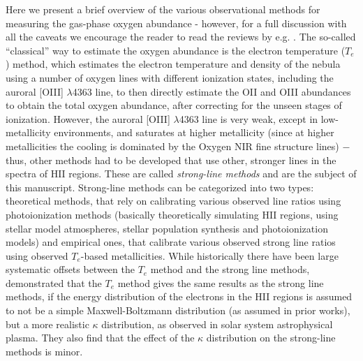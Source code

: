 \documentclass{emulateapj}
\begin{document}
Here we present a brief overview of the various observational methods for measuring the gas-phase oxygen abundance - however, for a full discussion with all the caveats we encourage the reader to read the reviews by e.g. \citet{stasinska02,kewley08,moustakas10,stasinska10,dopita13,blanc15}.
The so-called ``classical'' way to estimate the oxygen abundance is the electron temperature ($T_e$) method, which estimates the electron temperature and density of the nebula using a number of oxygen lines with different ionization states, including the auroral [OIII] $\lambda$4363 line, to then directly estimate the OII and OIII abundances to obtain the total oxygen abundance, after correcting for the unseen stages of ionization. However, the auroral [OIII] $\lambda$4363 line is very weak, except in low-metallicity environments, and saturates at higher metallicity (since at higher metallicities the cooling is dominated by the Oxygen NIR fine structure lines) $-$ thus, other methods had to be developed that use other, stronger lines in the spectra of HII regions. These are called \emph{strong-line methods} and are the subject of this manuscript. Strong-line methods can be categorized into two types: theoretical methods, that rely on calibrating various observed line ratios using photoionization methods (basically theoretically simulating HII regions, using stellar model atmospheres, stellar population synthesis and photoionization models) and empirical ones, that calibrate various observed strong line ratios using observed $T_e$-based metallicities. While historically there have been large systematic offsets between the $T_e$ method and the strong line methods, \citet{dopita13} demonstrated that the $T_e$ method gives the same results as the strong line methods, if the energy distribution of the electrons in the HII regions is assumed to not be a simple Maxwell-Boltzmann distribution (as assumed in prior works), but a more realistic $\kappa$ distribution, as observed in solar system astrophysical plasma. They also find that the effect of the $\kappa$ distribution on the strong-line methods is minor. 
\end{document}
